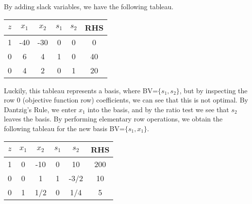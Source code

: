 By adding slack variables, we have the following tableau.
\begin{table}[h!] \begin{center} \begin{tabular} {|c|c|c|c|c||c|}
\hline
$z$ & $x_1$ & $x_2$ & $s_1$ & $s_2$ & RHS \\ \hline
  1 & -40 & -30 & 0   & 0   & 0  \\
  0 &   6 &   4 & 1   & 0   & 40 \\
  0 &   4 &   2 & 0   & 1   & 20 \\ \hline
\end{tabular} \end{center} \end{table}
Luckily, this tableau represents a basis, where BV=$\{s_1, s_2\}$, but by inspecting the row 0 (objective function row) coefficients, we can see that this is not optimal. By Dantzig's Rule, we enter $x_1$ into the basis, and by the ratio test we see that $s_2$ leaves the basis.  By performing elementary row operations, we obtain the following tableau for
the new basis BV=$\{s_1, x_1\}$.
\begin{center} \begin{tabular} {|c|c|c|c|c||c|} \hline
$z$ & $x_1$ & $x_2$ & $s_1$ & $s_2$ & RHS \\
\hline
  1 &     0 &   -10 & 0     &    10 & 200 \\
  0 &     0 &     1 & 1     &  -3/2 & 10 \\
  0 &     1 &   1/2 & 0     &   1/4 &  5 \\
\hline
\end{tabular} \end{center}

